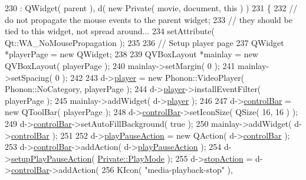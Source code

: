 \begin{DoxyCode}
230     : QWidget( parent ), d( \textcolor{keyword}{new} Private( movie, document, \textcolor{keyword}{this} ) )
231 \{
232     \textcolor{comment}{// do not propagate the mouse events to the parent widget;}
233     \textcolor{comment}{// they should be tied to this widget, not spread around...}
234     setAttribute( Qt::WA\_NoMousePropagation );
235 
236     \textcolor{comment}{// Setup player page}
237     QWidget *playerPage = \textcolor{keyword}{new} QWidget;
238 
239     QVBoxLayout *mainlay = \textcolor{keyword}{new} QVBoxLayout( playerPage );
240     mainlay->setMargin( 0 );
241     mainlay->setSpacing( 0 );
242 
243     d->\hyperlink{classVideoWidget_1_1Private_ad25b2b9ba312490e52b2c21861aceaa1}{player} = \textcolor{keyword}{new} Phonon::VideoPlayer( Phonon::NoCategory, playerPage );
244     d->\hyperlink{classVideoWidget_1_1Private_ad25b2b9ba312490e52b2c21861aceaa1}{player}->installEventFilter( playerPage );
245     mainlay->addWidget( d->\hyperlink{classVideoWidget_1_1Private_ad25b2b9ba312490e52b2c21861aceaa1}{player} );
246 
247     d->\hyperlink{classVideoWidget_1_1Private_a1b6973ec2db407feeaaa362f436440f5}{controlBar} = \textcolor{keyword}{new} QToolBar( playerPage );
248     d->\hyperlink{classVideoWidget_1_1Private_a1b6973ec2db407feeaaa362f436440f5}{controlBar}->setIconSize( QSize( 16, 16 ) );
249     d->\hyperlink{classVideoWidget_1_1Private_a1b6973ec2db407feeaaa362f436440f5}{controlBar}->setAutoFillBackground( \textcolor{keyword}{true} );
250     mainlay->addWidget( d->\hyperlink{classVideoWidget_1_1Private_a1b6973ec2db407feeaaa362f436440f5}{controlBar} );
251 
252     d->\hyperlink{classVideoWidget_1_1Private_a573e20300c27f08b5d9f4bcff46d21ce}{playPauseAction} = \textcolor{keyword}{new} QAction( d->\hyperlink{classVideoWidget_1_1Private_a1b6973ec2db407feeaaa362f436440f5}{controlBar} );
253     d->\hyperlink{classVideoWidget_1_1Private_a1b6973ec2db407feeaaa362f436440f5}{controlBar}->addAction( d->\hyperlink{classVideoWidget_1_1Private_a573e20300c27f08b5d9f4bcff46d21ce}{playPauseAction} );
254     d->\hyperlink{classVideoWidget_1_1Private_a6f2d55d3df5ed98d793bf208b5128708}{setupPlayPauseAction}( \hyperlink{classVideoWidget_1_1Private_aa685363ecfd1874cfe0a9901cd86ede2a4211aefb1bf1a9dba29b939c6b811d33}{Private::PlayMode} );
255     d->\hyperlink{classVideoWidget_1_1Private_a1c5aa30fc3d0f10c2cb4f4f76eca14db}{stopAction} = d->\hyperlink{classVideoWidget_1_1Private_a1b6973ec2db407feeaaa362f436440f5}{controlBar}->addAction(
256         KIcon( \textcolor{stringliteral}{"media-playback-stop"} ),

\end{DoxyCode}
